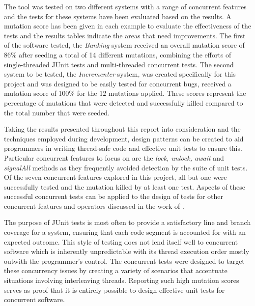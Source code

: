 \documentclass[a4paper,12pt]{article}
\begin{document}
The tool was tested on two different systems with a range of concurrent features and the tests for these systems have been evaluated based on the results. A mutation score has been given in each example to evaluate the effectiveness of the tests and the results tables indicate the areas that need improvements. The first of the software tested, the \textit{Banking} system received an overall mutation score of 86\% after seeding a total of 14 different mutations, combining the efforts of single-threaded JUnit tests and multi-threaded concurrent tests. The second system to be tested, the \textit{Incrementer} system, was created specifically for this project and was designed to be easily tested for concurrent bugs, received a mutation score of 100\% for the 12 mutations applied. These scores represent the percentage of mutations that were detected and successfully killed compared to the total number that were seeded. 

Taking the results presented throughout this report into consideration and the techniques employed during development, design patterns can be created to aid programmers in writing thread-safe code and effective unit tests to ensure this. Particular concurrent features to focus on are the \textit{lock, unlock, await} and \textit{signalAll} methods as they frequently avoided detection by the suite of unit tests. Of the seven concurrent features explored in this project, all but one were successfully tested and the mutation killed by at least one test. Aspects of these successful concurrent tests can be applied to the design of tests for other concurrent features and operators discussed in the work of \citet{bradbury06}.      

The purpose of JUnit tests is most often to provide a satisfactory line and branch coverage for a system, ensuring that each code segment is accounted for with an expected outcome. This style of testing does not lend itself well to concurrent software which is inherently unpredictable with its thread execution order mostly outwith the programmer's control. The concurrent tests were designed to target these concurrency issues by creating a variety of scenarios that accentuate situations involving interleaving threads. Reporting such high mutation scores serves as proof that it is entirely possible to design effective unit tests for concurrent software.   


    
\newpage


\end{document}
